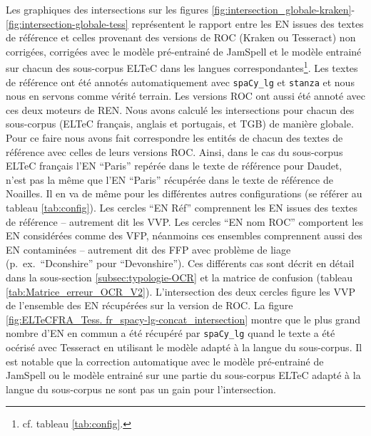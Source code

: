 Les graphiques des intersections sur les figures \ref{fig:intersection_globale-kraken}-\ref{fig:intersection-globale-tess} représentent le rapport entre les EN issues des textes de référence et celles provenant des versions de ROC (Kraken ou Tesseract) non corrigées, corrigées avec le modèle pré-entrainé de JamSpell et le modèle entrainé sur chacun des sous-corpus ELTeC dans les langues correspondantes\footnote{cf. tableau \ref{tab:config}.}. Les textes de référence ont été annotés automatiquement avec \texttt{spaCy\_lg} et \texttt{stanza} et nous nous en servons comme vérité terrain. Les versions ROC ont aussi été annoté avec ces deux moteurs de REN. Nous avons calculé les intersections pour chacun des sous-corpus (ELTeC français, anglais et portugais, et TGB) de manière globale. Pour ce faire nous avons fait correspondre les entités de chacun des textes de référence avec celles de leurs versions ROC. Ainsi, dans le cas du sous-corpus ELTeC français l'EN ``Paris'' repérée dans le texte de référence pour Daudet, n'est pas la même que l'EN ``Paris'' récupérée dans le texte de référence de Noailles. Il en va de même pour les différentes autres configurations (se référer au tableau \ref{tab:config}).
Les cercles ``EN Réf'' comprennent les EN issues des textes de référence -- autrement dit les VVP. Les cercles ``EN nom ROC'' comportent les EN considérées comme des VFP, néanmoins ces ensembles comprennent aussi des EN contaminées -- autrement dit des FFP avec problème de liage (p.\ ex.\ ``Dconshire'' pour ``Devonshire''). Ces différents cas sont décrit en détail dans la sous-section \ref{subsec:typologie-OCR} et la matrice de confusion (tableau \ref{tab:Matrice_erreur_OCR_V2}). L'intersection des deux cercles figure les VVP de l'ensemble des EN récupérées sur la version de ROC.
La figure \ref{fig:ELTeCFRA_Tess. fr_spacy-lg-concat_intersection} montre que le plus grand nombre d'EN en commun a été récupéré par \texttt{spaCy\_lg} quand le texte a été océrisé avec Tesseract en utilisant le modèle adapté à la langue du sous-corpus. Il est notable que la correction automatique avec le modèle pré-entrainé de JamSpell ou le modèle entrainé sur une partie du sous-corpus ELTeC adapté à la langue du sous-corpus ne sont pas un gain pour l'intersection. 
